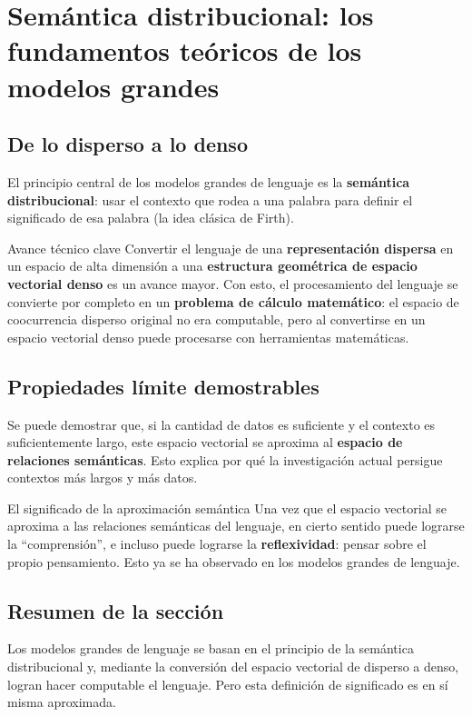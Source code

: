 \section{Semántica distribucional: los fundamentos teóricos de los modelos grandes}

\subsection{De lo disperso a lo denso}

El principio central de los modelos grandes de lenguaje es la \textbf{semántica distribucional}: usar el contexto que rodea a una palabra para definir el significado de esa palabra (la idea clásica de Firth).

\begin{knowledgebox}{Avance técnico clave}
Convertir el lenguaje de una \textbf{representación dispersa} en un espacio de alta dimensión a una \textbf{estructura geométrica de espacio vectorial denso} es un avance mayor. Con esto, el procesamiento del lenguaje se convierte por completo en un \textbf{problema de cálculo matemático}: el espacio de coocurrencia disperso original no era computable, pero al convertirse en un espacio vectorial denso puede procesarse con herramientas matemáticas.
\end{knowledgebox}

\subsection{Propiedades límite demostrables}

Se puede demostrar que, si la cantidad de datos es suficiente y el contexto es suficientemente largo, este espacio vectorial se aproxima al \textbf{espacio de relaciones semánticas}. Esto explica por qué la investigación actual persigue contextos más largos y más datos.

\begin{importantbox}{El significado de la aproximación semántica}
Una vez que el espacio vectorial se aproxima a las relaciones semánticas del lenguaje, en cierto sentido puede lograrse la ``comprensión'', e incluso puede lograrse la \textbf{reflexividad}: pensar sobre el propio pensamiento. Esto ya se ha observado en los modelos grandes de lenguaje.
\end{importantbox}

\subsection{Resumen de la sección}

Los modelos grandes de lenguaje se basan en el principio de la semántica distribucional y, mediante la conversión del espacio vectorial de disperso a denso, logran hacer computable el lenguaje. Pero esta definición de significado es en sí misma aproximada.

